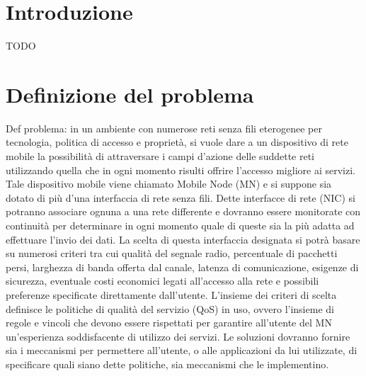 \documentclass[12pt,a4paper,openright,twoside]{book}
\begin{document}
%
%
\begin{titlepage}
  \thispagestyle{empty}
  \topmargin=6.5cm
  \raggedleft
  \large
  \newpage
  \clearpage{\pagestyle{empty}\cleardoublepage}
\end{titlepage}



\chapter*{Introduzione}

TODO

\clearpage{\pagestyle{empty}\cleardoublepage}

\tableofcontents
\rhead[\fancyplain{}{\bfseries\leftmark}]{\fancyplain{}{\bfseries\thepage}}
\clearpage{\pagestyle{empty}\cleardoublepage}

\chapter{Definizione del problema}
 Def problema: in un ambiente con numerose reti
senza fili eterogenee per tecnologia, politica di accesso e proprietà,
si vuole dare a un dispositivo di rete mobile la possibilità di
attraversare i campi d'azione delle suddette reti utilizzando quella
che in ogni momento risulti offrire l'accesso migliore ai
servizi. Tale dispositivo mobile viene chiamato Mobile Node (MN) e si
suppone sia dotato di più d'una interfaccia di rete senza fili. Dette
interfacce di rete (NIC) si potranno associare ognuna a una rete
differente e dovranno essere monitorate con continuità per determinare
in ogni momento quale di queste sia la più adatta ad effettuare
l'invio dei dati. La scelta di questa interfaccia designata si potrà
basare su numerosi criteri tra cui qualità del segnale radio,
percentuale di pacchetti persi, larghezza di banda offerta dal canale,
latenza di comunicazione, esigenze di sicurezza, eventuale costi
economici legati all'accesso alla rete e possibili preferenze
specificate direttamente dall'utente. L'insieme dei criteri di scelta
definisce le politiche di qualità del servizio (QoS) in uso, ovvero
l'insieme di regole e vincoli che devono essere rispettati per
garantire all'utente del MN un'esperienza soddisfacente di utilizzo
dei servizi. Le soluzioni dovranno fornire sia i meccanismi per
permettere all'utente, o alle applicazioni da lui utilizzate, di
specificare quali siano dette politiche, sia meccanismi che le
implementino.
\end{document}
